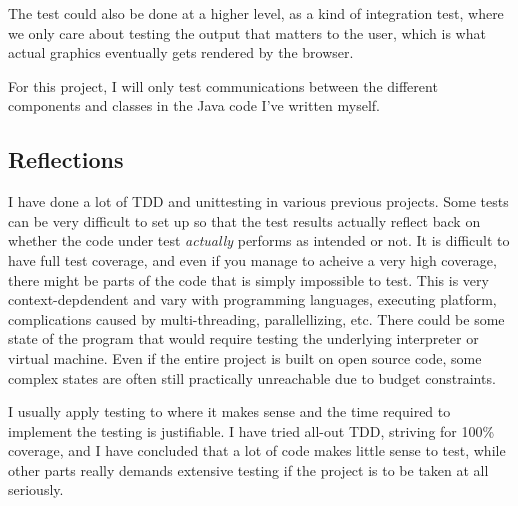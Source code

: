 The test could also be done at a higher level, as a kind of integration test,
where we only care about testing the output that matters to the user, which is
what actual graphics eventually gets rendered by the browser.

For this project, I will only test communications between the different 
components and classes in the Java code I've written myself.


\subsection{Reflections}\label{task-2-reflect}
I have done a lot of TDD and unittesting in various previous projects.  Some
tests can be very difficult to set up so that the test results actually reflect
back on whether the code under test \emph{actually} performs as intended or
not. It is difficult to have full test coverage\cite{wiki:code-coverage}, and
even if you manage to acheive a very high coverage, there might be parts of the
code that is simply impossible to test. This is very context-depdendent and
vary with programming languages, executing platform, complications caused by
multi-threading, parallellizing, etc. There could be some state of the program
that would require testing the underlying interpreter or virtual machine. Even
if the entire project is built on open source code, some complex states are
often still practically unreachable due to budget constraints.

I usually apply testing to where it makes sense and the time required to
implement the testing is justifiable. I have tried all-out TDD, striving for
100\% coverage, and I have concluded that a lot of code makes little sense to
test, while other parts really demands extensive testing if the project is to
be taken at all seriously.


